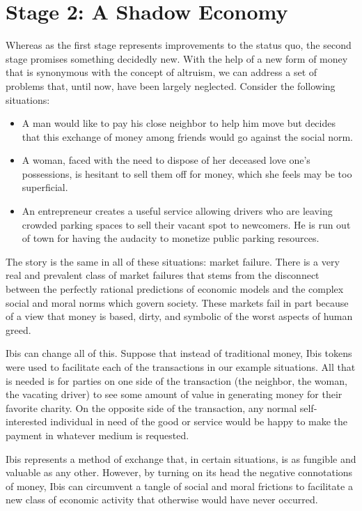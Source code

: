 \documentclass{article} \usepackage{parskip} \usepackage{titlesec}
\begin{document}
\section{Stage 2: A Shadow Economy}

Whereas as the first stage represents improvements to the status quo, the second
stage promises something decidedly new. With the help of a new form of money
that is synonymous with the concept of altruism, we can address a set of
problems that, until now, have been largely neglected. Consider the following
situations:

\begin{itemize}
\item A man would like to pay his close neighbor to help him move but decides
  that this exchange of money among friends would go against the social norm.
\item A woman, faced with the need to dispose of her deceased love one’s
  possessions, is hesitant to sell them off for money, which she feels may be too
  superficial.
\item An entrepreneur creates a useful service allowing drivers who are leaving
  crowded parking spaces to sell their vacant spot to newcomers. He is run out of
  town for having the audacity to monetize public parking resources.
\end{itemize}

The story is the same in all of these situations: market failure. There is a
very real and prevalent class of market failures that stems from the disconnect
between the perfectly rational predictions of economic models and the complex
social and moral norms which govern society. These markets fail in part because
of a view that money is based, dirty, and symbolic of the worst aspects of human
greed.

Ibis can change all of this. Suppose that instead of traditional money, Ibis
tokens were used to facilitate each of the transactions in our example
situations. All that is needed is for parties on one side of the transaction
(the neighbor, the woman, the vacating driver) to see some amount of value in
generating money for their favorite charity. On the opposite side of the
transaction, any normal self-interested individual in need of the good or
service would be happy to make the payment in whatever medium is requested.

Ibis represents a method of exchange that, in certain situations, is as fungible
and valuable as any other. However, by turning on its head the negative
connotations of money, Ibis can circumvent a tangle of social and moral
frictions to facilitate a new class of economic activity that otherwise would
have never occurred.
\end{document}
